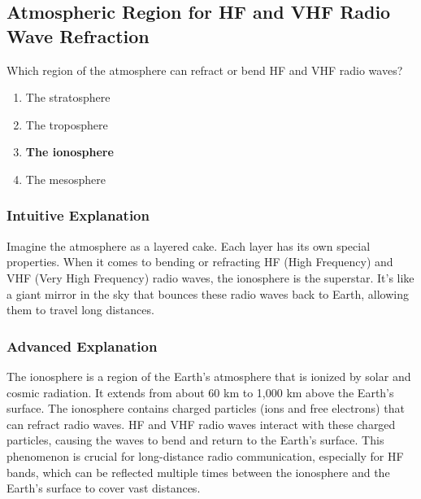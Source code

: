 \subsection{Atmospheric Region for HF and VHF Radio Wave Refraction}
\label{T3A11}

\begin{tcolorbox}[colback=gray!10!white,colframe=black!75!black,title=T3A11]
Which region of the atmosphere can refract or bend HF and VHF radio waves?
\begin{enumerate}[noitemsep]
    \item The stratosphere
    \item The troposphere
    \item \textbf{The ionosphere}
    \item The mesosphere
\end{enumerate}
\end{tcolorbox}

\subsubsection*{Intuitive Explanation}
Imagine the atmosphere as a layered cake. Each layer has its own special properties. When it comes to bending or refracting HF (High Frequency) and VHF (Very High Frequency) radio waves, the ionosphere is the superstar. It's like a giant mirror in the sky that bounces these radio waves back to Earth, allowing them to travel long distances.

\subsubsection*{Advanced Explanation}
The ionosphere is a region of the Earth's atmosphere that is ionized by solar and cosmic radiation. It extends from about 60 km to 1,000 km above the Earth's surface. The ionosphere contains charged particles (ions and free electrons) that can refract radio waves. HF and VHF radio waves interact with these charged particles, causing the waves to bend and return to the Earth's surface. This phenomenon is crucial for long-distance radio communication, especially for HF bands, which can be reflected multiple times between the ionosphere and the Earth's surface to cover vast distances.

